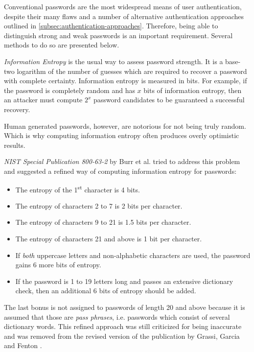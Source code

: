 Conventional passwords are the most widespread means of user authentication, despite their many flaws and a number of alternative authentication approaches outlined in \ref{subsec:authentication-approaches}. Therefore, being able to distinguish strong and weak passwords is an important requirement. Several methods to do so are presented below.

\emph{Information Entropy} is the usual way to assess password strength. It is a base-two logarithm of the number of guesses which are required to recover a password with complete certainty. Information entropy is measured in bits. For example, if the password is completely random and has \(x\) bits of information entropy, then an attacker must compute \(2^x\) password candidates to be guaranteed a successful recovery.

Human generated passwords, however, are notorious for not being truly random. Which is why computing information entropy often produces overly optimistic results.

\emph{NIST Special Publication 800-63-2} by Burr et al. \cite{burr2013electronic} tried to address this problem and suggested a refined way of computing information entropy for passwords:

\begin{itemize}
    \item The entropy of the 1\textsuperscript{st} character is 4 bits.
    \item The entropy of characters 2 to 7 is 2 bits per character.
    \item The entropy of characters 9 to 21 is 1.5 bits per character.
    \item The entropy of characters 21 and above is 1 bit per character.
    \item If \emph{both} uppercase letters and non-alphabetic characters are used, the password gains 6 more bits of entropy.
    \item If the password is 1 to 19 letters long and passes an extensive dictionary check, then an additional 6 bits of entropy should be added.
  \end{itemize}

The last bonus is not assigned to passwords of length 20 and above because it is assumed that those are \emph{pass phrases}, i.e. passwords which consist of several dictionary words. This refined approach was still criticized for being inaccurate and was removed from the revised version of the publication by Grassi, Garcia and Fenton \cite{grassi2017digital}.

